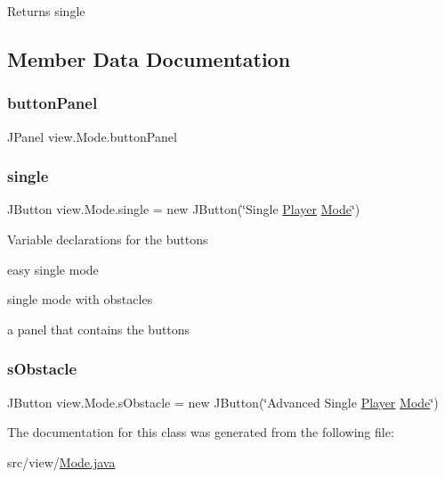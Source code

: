 \begin{DoxyReturn}{Returns}
single 
\end{DoxyReturn}


\subsection{Member Data Documentation}
\hypertarget{classview_1_1_mode_ab457e88b13dca6e72659a05f9d6d7853}{}\label{classview_1_1_mode_ab457e88b13dca6e72659a05f9d6d7853} 
\subsubsection{\texorpdfstring{button\+Panel}{buttonPanel}}
{\footnotesize\ttfamily J\+Panel view.\+Mode.\+button\+Panel\hspace{0.3cm}{\ttfamily [private]}}

\hypertarget{classview_1_1_mode_a79eea473b39369327297c8788dd071c2}{}\label{classview_1_1_mode_a79eea473b39369327297c8788dd071c2} 
\subsubsection{\texorpdfstring{single}{single}}
{\footnotesize\ttfamily J\+Button view.\+Mode.\+single = new J\+Button(\char`\"{}Single \hyperlink{classmodel_1_1_player}{Player} \hyperlink{classview_1_1_mode}{Mode}\char`\"{})\hspace{0.3cm}{\ttfamily [private]}}

Variable declarations for the buttons
\begin{DoxyItemize}
\item easy single mode
\item single mode with obstacles
\item a panel that contains the buttons 
\end{DoxyItemize}\hypertarget{classview_1_1_mode_a015d017e7fa759ee77d191c4d03ee531}{}\label{classview_1_1_mode_a015d017e7fa759ee77d191c4d03ee531} 
\subsubsection{\texorpdfstring{s\+Obstacle}{sObstacle}}
{\footnotesize\ttfamily J\+Button view.\+Mode.\+s\+Obstacle = new J\+Button(\char`\"{}Advanced Single \hyperlink{classmodel_1_1_player}{Player} \hyperlink{classview_1_1_mode}{Mode}\char`\"{})\hspace{0.3cm}{\ttfamily [private]}}



The documentation for this class was generated from the following file\+:\begin{DoxyCompactItemize}
\item 
src/view/\hyperlink{_mode_8java}{Mode.\+java}\end{DoxyCompactItemize}
